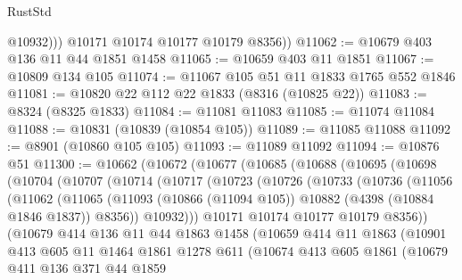 \begin{lexlean}{RustStd}
\begin{coremodule}
              @10932)))
        @10171
        @10174
        @10177
        @10179
        @8356))
@11062 := @10679 @403 @136 @11 @44 @1851 @1458
@11065 := @10659 @403 @11 @1851
@11067 := @10809 @134 @105
@11074 := @11067 @105 @51 @11 @1833 @1765 @552 @1846
@11081 := @10820 @22 @112 @22 @1833 (@8316 (@10825 @22))
@11083 := @8324 (@8325 @1833)
@11084 := @11081 @11083
@11085 := @11074 @11084
@11088 := @10831 (@10839 (@10854 @105))
@11089 := @11085 @11088
@11092 := @8901 (@10860 @105 @105)
@11093 := @11089 @11092
@11094 := @10876 @51
@11300 := @10662
    (@10672
      (@10677
        (@10685
          (@10688
            (@10695
              (@10698
                (@10704
                  (@10707
                    (@10714
                      (@10717
                        (@10723
                          (@10726
                            (@10733
                              (@10736
                                (@11056
                                  (@11062
                                    (@11065
                                      (@11093
                                        (@10866 (@11094 @105))
                                        @10882
                                        (@4398 (@10884 @1846 @1837))
                                        @8356))
                                    @10932)))
                              @10171
                              @10174
                              @10177
                              @10179
                              @8356))
                          (@10679
                            @414
                            @136
                            @11
                            @44
                            @1863
                            @1458
                            (@10659
                              @414
                              @11
                              @1863
                              (@10901
                                @413
                                @605
                                @11
                                @1464
                                @1861
                                @1278
                                @611
                                (@10674
                                  @413
                                  @605
                                  @1861
                                  (@10679
                                    @411
                                    @136
                                    @371
                                    @44
                                    @1859

\end{coremodule}
\end{lexlean}
